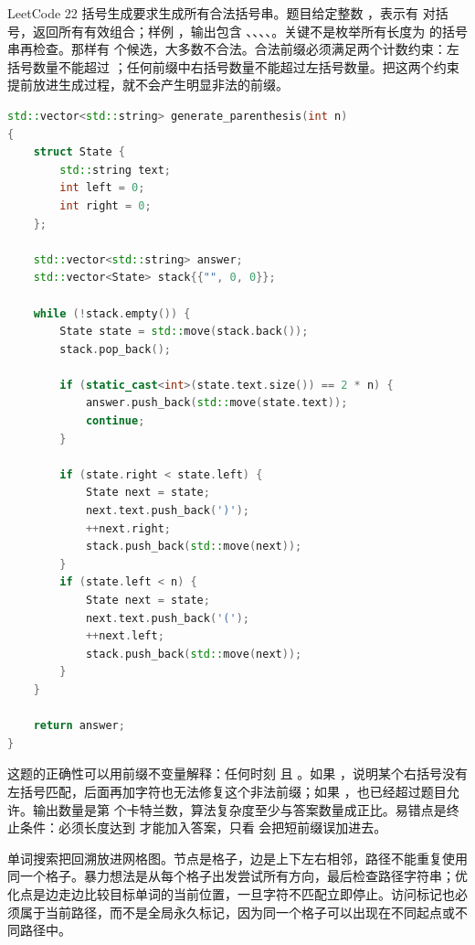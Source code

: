 LeetCode 22 括号生成要求生成所有合法括号串。题目给定整数 ，表示有  对括号，返回所有有效组合；样例 ，输出包含 、、、、。关键不是枚举所有长度为  的括号串再检查。那样有  个候选，大多数不合法。合法前缀必须满足两个计数约束：左括号数量不能超过 ；任何前缀中右括号数量不能超过左括号数量。把这两个约束提前放进生成过程，就不会产生明显非法的前缀。

\begin{lstlisting}[language=C++,caption={LeetCode 22 括号生成：前缀合法性剪枝}]
std::vector<std::string> generate_parenthesis(int n)
{
    struct State {
        std::string text;
        int left = 0;
        int right = 0;
    };

    std::vector<std::string> answer;
    std::vector<State> stack{{"", 0, 0}};

    while (!stack.empty()) {
        State state = std::move(stack.back());
        stack.pop_back();

        if (static_cast<int>(state.text.size()) == 2 * n) {
            answer.push_back(std::move(state.text));
            continue;
        }

        if (state.right < state.left) {
            State next = state;
            next.text.push_back(')');
            ++next.right;
            stack.push_back(std::move(next));
        }
        if (state.left < n) {
            State next = state;
            next.text.push_back('(');
            ++next.left;
            stack.push_back(std::move(next));
        }
    }

    return answer;
}
\end{lstlisting}

这题的正确性可以用前缀不变量解释：任何时刻  且 。如果 ，说明某个右括号没有左括号匹配，后面再加字符也无法修复这个非法前缀；如果 ，也已经超过题目允许。输出数量是第  个卡特兰数，算法复杂度至少与答案数量成正比。易错点是终止条件：必须长度达到  才能加入答案，只看  会把短前缀误加进去。

单词搜索把回溯放进网格图。节点是格子，边是上下左右相邻，路径不能重复使用同一个格子。暴力想法是从每个格子出发尝试所有方向，最后检查路径字符串；优化点是边走边比较目标单词的当前位置，一旦字符不匹配立即停止。访问标记也必须属于当前路径，而不是全局永久标记，因为同一个格子可以出现在不同起点或不同路径中。

